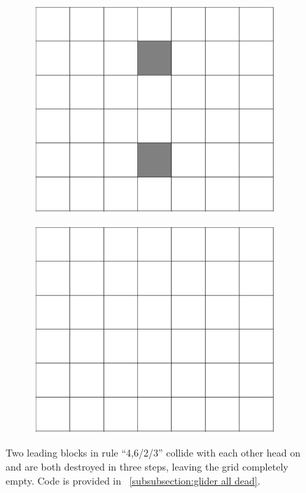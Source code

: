 \documentclass[12pt]{article}
\numberwithin{figure}{section} %
\begin{document}
\begin{figure}[H]
     	\begin{subfigure}{0.23\textwidth}
     	\centering
     	\includegraphics[width=\linewidth]{Section4/31.2}
     	\subcaption{}
   	\end{subfigure}
        	\begin{subfigure}{0.23\textwidth}
     	\centering
     	\includegraphics[width=\linewidth]{Section4/31.3}
     	\subcaption{}
   	\end{subfigure}
   \caption[Destroyed gliders in collision]{Two leading blocks in rule “4,6/2/3” collide with each other head on and are both destroyed in three steps, leaving the grid completely empty. Code is provided in ~\ref{subsubsection:glider all dead}. }
   \label{fig:glider all dead}
\end{figure}
\end{document}
